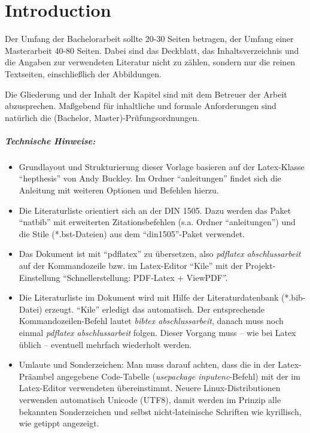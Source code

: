 \chapter{Introduction}



Der Umfang der Bachelorarbeit sollte 20-30 Seiten betragen, der Umfang einer Masterarbeit 40-80 Seiten.
Dabei sind das Deckblatt, das  Inhaltsverzeichnis  und  die  Angaben  zur  verwendeten  Literatur  nicht  zu  zählen, sondern nur die reinen Textseiten, einschließlich der Abbildungen.

Die Gliederung und der Inhalt der Kapitel sind mit dem Betreuer der Arbeit abzusprechen. Maßgebend für inhaltliche und formale Anforderungen sind natürlich die (Bachelor, Master)-\-Prüfungs\-ordnungen.

\paragraph{Technische Hinweise:}
\begin{itemize}
  \item Grundlayout und Strukturierung dieser Vorlage basieren auf der Latex-Klasse ``hepthesis'' von Andy Buckley. Im Ordner ``anleitungen'' findet sich die Anleitung mit weiteren Optionen und Befehlen hierzu.
  \item Die Literaturliste orientiert sich an der DIN 1505. Dazu werden das Paket ``natbib'' mit erweiterten Zitationsbefehlen (s.a. Ordner ``anleitungen'') und die Stile (*.bst-Dateien) aus dem ``din1505''-Paket verwendet. 
  \item Das Dokument ist mit ``pdflatex'' zu übersetzen, also \textit{pdflatex abschlussarbeit} auf der Kommandozeile bzw. im Latex-Editor ``Kile'' mit der Projekt-Einstellung ``Schnell\-erstellung: PDF-Latex + ViewPDF''.
  \item Die Literaturliste im Dokument wird mit Hilfe der Literaturdatenbank (*.bib-Datei) erzeugt. ``Kile'' erledigt das automatisch. Der entsprechende Kommando\-zeilen-Befehl lautet \textit{bibtex abschlussarbeit}, danach muss noch einmal \textit{pdflatex abschlussarbeit} folgen. Dieser Vorgang muss -- wie bei Latex üblich -- eventuell mehrfach wiederholt werden.
  \item Umlaute und Sonderzeichen: Man muss darauf achten, dass die in der Latex-Präambel angegebene Code-Tabelle (\textit{usepackage inputenc}-Befehl) mit der im Latex-Editor verwendeten übereinstimmt. Neuere Linux-Distributionen verwenden automatisch Unicode (UTF8), damit werden im Prinzip alle bekannten Sonderzeichen und selbst nicht-lateinische Schriften wie kyrillisch, wie getippt angezeigt.
\end{itemize}

